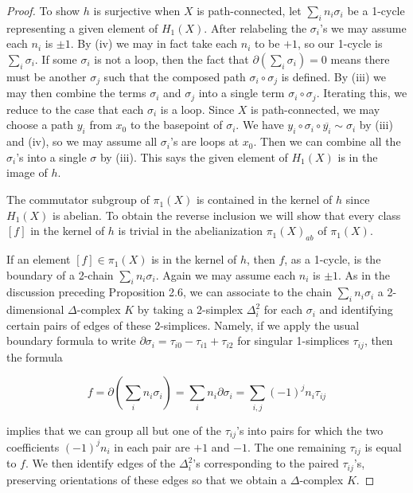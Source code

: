 \begin{proof}
To show $h$ is surjective when $X$ is path-connected, let $\sum_i n_i\sigma_i$ be a 1-cycle representing a given element of $H_1(X)$. After relabeling the $\sigma_i$'s we may assume each $n_i$ is $\pm 1$. By (iv) we may in fact take each $n_i$ to be $+1$, so our 1-cycle is $\sum_i \sigma_i$. If some $\sigma_i$ is not a loop, then the fact that $\partial(\sum_i \sigma_i) = 0$ means there must be another $\sigma_j$ such that the composed path $\sigma_i \circ \sigma_j$ is defined. By (iii) we may then combine the terms $\sigma_i$ and $\sigma_j$ into a single term $\sigma_i \circ \sigma_j$. Iterating this, we reduce to the case that each $\sigma_i$ is a loop. Since $X$ is path-connected, we may choose a path $y_i$ from $x_0$ to the basepoint of $\sigma_i$. We have $y_i \circ \sigma_i \circ \overline{y_i} \sim \sigma_i$ by (iii) and (iv), so we may assume all $\sigma_i$'s are loops at $x_0$. Then we can combine all the $\sigma_i$'s into a single $\sigma$ by (iii). This says the given element of $H_1(X)$ is in the image of $h$.

The commutator subgroup of $\pi_1(X)$ is contained in the kernel of $h$ since $H_1(X)$ is abelian. To obtain the reverse inclusion we will show that every class $[f]$ in the kernel of $h$ is trivial in the abelianization $\pi_1(X)_{ab}$ of $\pi_1(X)$.

If an element $[f] \in \pi_1(X)$ is in the kernel of $h$, then $f$, as a 1-cycle, is the boundary of a 2-chain $\sum_i n_i \sigma_i$. Again we may assume each $n_i$ is $\pm 1$. As in the discussion preceding Proposition 2.6, we can associate to the chain $\sum_i n_i\sigma_i$ a 2-dimensional $\Delta$-complex $K$ by taking a 2-simplex $\Delta_i^2$ for each $\sigma_i$ and identifying certain pairs of edges of these 2-simplices. Namely, if we apply the usual boundary formula to write $\partial \sigma_i = \tau_{i0} - \tau_{i1} + \tau_{i2}$ for singular 1-simplices $\tau_{ij}$, then the formula



\[f = \partial\left(\sum_i n_i\sigma_i\right) = \sum_i n_i \partial \sigma_i = \sum_{i,j}(-1)^j n_i \tau_{ij}\]

implies that we can group all but one of the $\tau_{ij}$'s into pairs for which the two coefficients $(-1)^j n_i$ in each pair are $+1$ and $-1$. The one remaining $\tau_{ij}$ is equal to $f$. We then identify edges of the $\Delta_i^2$'s corresponding to the paired $\tau_{ij}$'s, preserving orientations of these edges so that we obtain a $\Delta$-complex $K$.


\end{proof}
